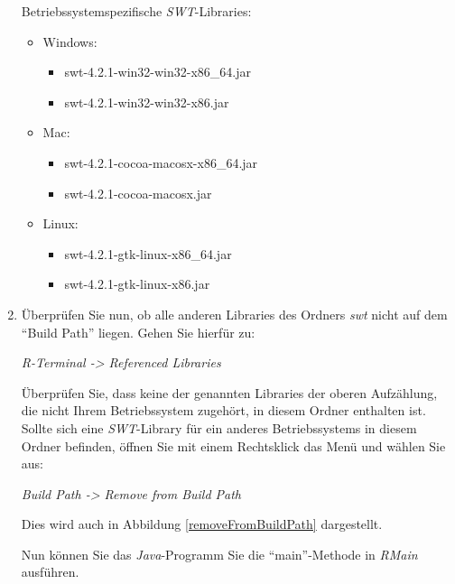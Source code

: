 \documentclass[a4paper, 12pt]{report} %
\begin{document}
\begin{enumerate}
	Betriebssystemspezifische \textit{SWT}-Libraries:
		
	\begin{itemize}
		\item Windows: \begin{itemize}
							\item swt-4.2.1-win32-win32-x86\_64.jar
							\item swt-4.2.1-win32-win32-x86.jar
						\end{itemize}
						
		\item Mac: \begin{itemize}
						\item swt-4.2.1-cocoa-macosx-x86\_64.jar
						\item swt-4.2.1-cocoa-macosx.jar
					\end{itemize}
		\item Linux: \begin{itemize}
						\item swt-4.2.1-gtk-linux-x86\_64.jar
						\item swt-4.2.1-gtk-linux-x86.jar
					 \end{itemize}
	\end{itemize} 
	
	\item Überprüfen Sie nun, ob alle anderen Libraries des Ordners \textit{swt} nicht auf dem "`Build Path"' liegen. 
		Gehen Sie hierfür zu:
		\begin{center}
			\textit{R-Terminal -> Referenced Libraries}
		\end{center} 
		
		Überprüfen Sie, dass keine der genannten Libraries der oberen Aufzählung, die nicht Ihrem Betriebssystem zugehört, in diesem Ordner enthalten ist.
		Sollte sich eine \textit{SWT}-Library für ein anderes Betriebssystems in diesem Ordner befinden, öffnen Sie mit einem Rechtsklick das Menü und wählen Sie aus: 
		\begin{center}
			\textit{Build Path -> Remove from Build Path}
		\end{center}	
		Dies wird auch in Abbildung \ref{removeFromBuildPath} dargestellt.
		
		Nun können Sie das \textit{Java}-Programm Sie die "`main"'-Methode in \textit{RMain} ausführen.
\end{enumerate}
\end{document}
